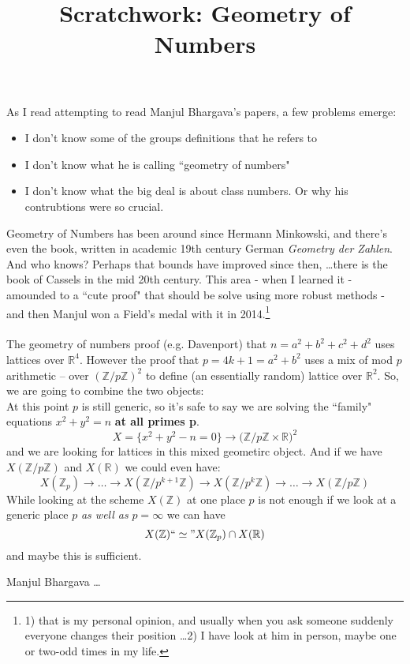 \documentclass[12pt]{article}
\title{Scratchwork: Geometry of Numbers}
\date{}
\begin{document}

\sffamily

\maketitle

\noindent As I read attempting to read Manjul Bhargava's papers, a few problems emerge:
\begin{itemize}
\item I don't know some of the groups definitions that he refers to
\item I don't know what he is calling ``geometry of numbers"
\item I don't know what the big deal is about class numbers.  Or why his contrubtions were so crucial.
\end{itemize}
Geometry of Numbers has been around since Hermann Minkowski, and there's even the book, written in academic 19th century German \textit{Geometry der Zahlen}.  And who knows?  Perhaps that bounds have improved since then, \dots there is the book of Cassels in the mid 20th century.  This area - when I learned it - amounded to a ``cute proof" that should be solve using more robust methods - and then Manjul won a Field's medal with it in 2014.\footnote{1) that is my personal opinion, and usually when you ask someone suddenly everyone changes their position \dots 2) I have look at him in person, maybe one or two-odd times in my life. }\\ \\
The geometry of numbers proof (e.g. Davenport) that $n = a^2 + b^2 + c^2 + d^2$ uses lattices over $\mathbb{R}^4$. However the proof that $p = 4k+1 = a^2 + b^2$ uses a mix of mod $p$ arithmetic -- over $(\mathbb{Z}/p\mathbb{Z})^2$ to define (an essentially random) lattice over $\mathbb{R}^2$.  So, we are going to combine the two objects:
$$  $$
At this point $p$ is still generic, so it's safe to say we are solving the ``family" equations $x^2 + y^2 = n$ \textbf{at all primes p}.
$$ X = \{ x^2 + y^2 - n = 0 \} \to \big( \mathbb{Z}/p\mathbb{Z} \times \mathbb{R} \big)^2 $$
and we are looking for lattices in this mixed geometirc object.  And if we have $X(\mathbb{Z}/p\mathbb{Z})$ and $X(\mathbb{R})$ we could even have:
$$ X(\mathbb{Z}_p) \to \dots \to X(\mathbb{Z}/p^{k+1}\mathbb{Z}) \to X(\mathbb{Z}/p^k \mathbb{Z}) \to \dots \to X(\mathbb{Z}/p \mathbb{Z})  $$
While looking at the scheme $X(\mathbb{Z})$ at one place $p$ is not enough if we look at a generic place $p$ \textit{as well as} $p = \infty$ we can have
$$ X(\mathbb{Z}) ``\simeq" X(\mathbb{Z}_p) \cap X(\mathbb{R})$$
and maybe this is sufficient.  
\vfill

\begin{thebibliography}{}
\item Manjul Bhargava \dots
\end{thebibliography}
\end{document}
